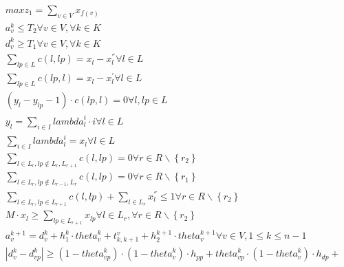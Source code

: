 \begin{align}
  &  \mathit{max} z_{1} = \sum_{v \in V} x_{f \left(v\right)}  \tag{eq\_0006} \\
  &  a_{v}^{k} \leq T_{2} \forall v \in V , \forall k \in K  \tag{eq\_0007} \\
  &  d_{v}^{k} \geq T_{1} \forall v \in V , \forall k \in K  \tag{eq\_0008} \\
  &  \sum_{lp \in L} c \left(l , lp\right) = x_{l} - x_{l}^{''} \forall l \in L  \tag{eq\_0009} \\
  &  \sum_{lp \in L} c \left(lp , l\right) = x_{l} - x_{l}^{'} \forall l \in L  \tag{eq\_0010} \\
  &  \left(y_{l} - y_{lp} - 1\right) \cdot c \left(lp , l\right) = 0 \forall l , lp \in L  \tag{eq\_0011} \\
  &  y_{l} = \sum_{i \in I} \mathit{lambda}_{l}^{i} \cdot i \forall l \in L  \tag{eq\_0012} \\
  &  \sum_{i \in I} \mathit{lambda}_{l}^{i} = x_{l} \forall l \in L  \tag{eq\_0013} \\
  &  \sum_{l \in L_{r}, lp \notin L_{r} , L_{r + 1}} c \left(l , lp\right) = 0 \forall r \in R \backslash \left\{r_{2}\right\}  \tag{eq\_0014} \\
  &  \sum_{l \in L_{r}, lp \notin L_{r - 1} , L_{r}} c \left(l , lp\right) = 0 \forall r \in R \backslash \left\{r_{1}\right\}  \tag{eq\_0015} \\
  &  \sum_{l \in L_{r}, lp \in L_{r + 1}} c \left(l , lp\right) + \sum_{l \in L_{r}} x_{l}^{''} \leq 1 \forall r \in R \backslash \left\{r_{2}\right\}  \tag{eq\_0016} \\
  &  M \cdot x_{l} \geq \sum_{lp \in L_{r + 1}} x_{lp} \forall l \in L_{r} , \forall r \in R \backslash \left\{r_{2}\right\}  \tag{eq\_0017} \\
  &  a_{v}^{k + 1} = d_{v}^{k} + h_{1}^{k} \cdot \mathit{theta}_{v}^{k} + t_{k , k + 1}^{v} + h_{2}^{k + 1} \cdot \mathit{theta}_{v}^{k + 1} \forall v \in V , 1 \leq k \leq n - 1  \tag{eq\_0018} \\
  & \left|\right. d_{v}^{k} - d_{vp}^{k} \left|\right. \geq \left(1 - \mathit{theta}_{vp}^{k}\right) \cdot \left(1 - \mathit{theta}_{v}^{k}\right) \cdot h_{p p} + \mathit{theta}_{vp}^{k} \cdot \left(1 - \mathit{theta}_{v}^{k}\right) \cdot h_{d p} + \tag{eq\_0019\_a} \\

\end{align}
